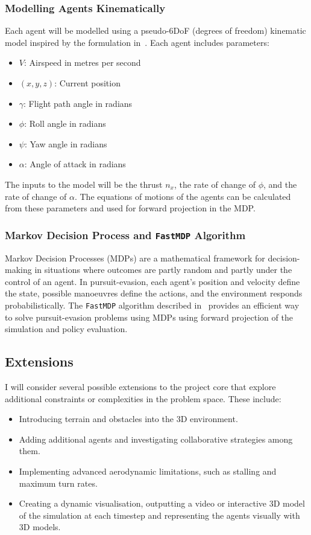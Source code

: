 \begin{refsection}
  \subsubsection*{Modelling Agents Kinematically}

  Each agent will be modelled using a pseudo-6DoF (degrees of freedom) kinematic model inspired by the formulation in~\cite{bertram3d}. Each agent includes parameters:
  \begin{itemize}
    \item $V$: Airspeed in metres per second
    \item $(x, y, z)$: Current position
    \item $\gamma$: Flight path angle in radians
    \item $\phi$: Roll angle in radians
    \item $\psi$: Yaw angle in radians
    \item $\alpha$: Angle of attack in radians
  \end{itemize}
  The inputs to the model will be the thrust $n_x$, the rate of change of $\phi$, and the rate of change of $\alpha$. The equations of motions of the agents can be calculated from these parameters and used for forward projection in the MDP\@.
  \subsubsection*{Markov Decision Process and \texttt{FastMDP} Algorithm}

  Markov Decision Processes (MDPs) are a mathematical framework for decision-making in situations where outcomes are partly random and partly under the control of an agent. In pursuit-evasion, each agent's position and velocity define the state, possible manoeuvres define the actions, and the environment responds probabilistically. 
  The \texttt{FastMDP} algorithm described in~\cite{BertramWei2021} provides an efficient way to solve pursuit-evasion problems using MDPs using forward projection of the simulation and policy evaluation.

  \subsection*{Extensions}

  I will consider several possible extensions to the project core that explore additional constraints or complexities in the problem space. These include:
  \begin{itemize}
      \item Introducing terrain and obstacles into the 3D environment.  
      \item Adding additional agents and investigating collaborative strategies among them.  
      \item Implementing advanced aerodynamic limitations, such as stalling and maximum turn rates.  
      \item Creating a dynamic visualisation, outputting a video or interactive 3D model of the simulation at each timestep and representing the agents visually with 3D models.
  \end{itemize}


\end{refsection}
